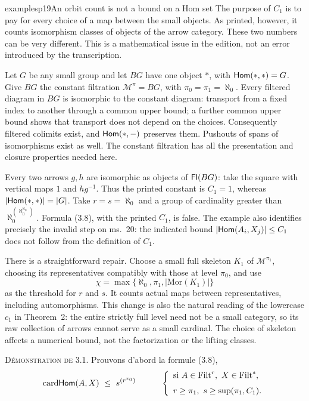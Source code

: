 \begin{dcomment}{examples}{p19}{An orbit count is not a bound on a Hom set}
The purpose of $C_1$ is to pay for every choice of a map between the small objects. As printed, however, it counts isomorphism classes of objects of the arrow category. These two numbers can be very different. This is a mathematical issue in the edition, not an error introduced by the transcription.

Let $G$ be any small group and let $BG$ have one object $*$, with $\mathsf{Hom}(*,*)=G$. Give $BG$ the constant filtration $\mathcal M^\pi=BG$, with $\pi_0=\pi_1=\aleph_0$. Every filtered diagram in $BG$ is isomorphic to the constant diagram: transport from a fixed index to another through a common upper bound; a further common upper bound shows that transport does not depend on the choices. Consequently filtered colimits exist, and $\mathsf{Hom}(*,-)$ preserves them. Pushouts of spans of isomorphisms exist as well. The constant filtration has all the presentation and closure properties needed here.

Every two arrows $g,h$ are isomorphic as objects of $\mathsf{Fl}(BG)$: take the square with vertical maps $1$ and $hg^{-1}$. Thus the printed constant is $C_1=1$, whereas $|\mathsf{Hom}(*,*)|=|G|$. Take $r=s=\aleph_0$ and a group of cardinality greater than $\aleph_0^{(\aleph_0^{\aleph_0})}$. Formula (3.8), with the printed $C_1$, is false. The example also identifies precisely the invalid step on ms.~20: the indicated bound $|\mathsf{Hom}(A_i,X_j)|\leq C_1$ does not follow from the definition of $C_1$.

There is a straightforward repair. Choose a small full skeleton $K_1$ of $\mathcal M^{\pi_1}$, choosing its representatives compatibly with those at level $\pi_0$, and use
\[
\chi=\max\{\aleph_0,\pi_1,|\mathrm{Mor}(K_1)|\}
\]
as the threshold for $r$ and $s$. It counts actual maps between representatives, including automorphisms. This change is also the natural reading of the lowercase $c_1$ in Theorem~2: the entire strictly full level need not be a small category, so its raw collection of arrows cannot serve as a small cardinal. The choice of skeleton affects a numerical bound, not the factorization or the lifting classes.
\end{dcomment}


\textsc{Démonstration de} 3.1. Prouvons d'abord la formule (3.8),
\[
\card\Hom(A,X)\ \leq\ s^{(r^{\pi_0})}\qquad\quad
\left\{\begin{array}{l}
\text{si } A\in\Filt^r,\ X\in\Filt^s,\\[1.5ex]
r\geq\pi_1,\ s\geq\sup(\pi_1,C_1).
\end{array}\right.
\]

